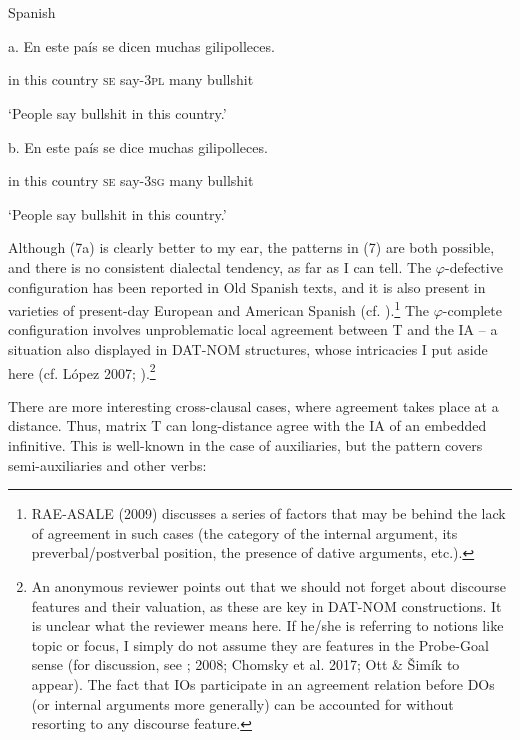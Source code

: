 \documentclass[output=paper]{langsci/langscibook}
\begin{document}
\ea%
    \label{ex:key:7}
    \gll\\
        \\
    \glt
    \z

          Spanish

a.   En  este  país        se   dicen       muchas  gilipolleces.       

        in   this   country  \textsc{se}  say\textsc{{}-3pl}  many     bullshit

             ‘People say bullshit in this country.’

  b.   En  este  país        se   dice        muchas  gilipolleces.      

        in   this   country  \textsc{se} say\textsc{{}-3sg}  many     bullshit

             ‘People say bullshit in this country.’

Although (7a) is clearly better to my ear, the patterns in (7) are both possible, and there is no consistent dialectal tendency, as far as I can tell. The $\varphi $-defective configuration has been reported in Old Spanish texts, and it is also present in varieties of present-day European and American Spanish (cf. \citealt{Mendikoetxea1999}).\footnote{RAE-ASALE (2009) discusses a series of factors that may be behind the lack of agreement in such cases (the category of the internal argument, its preverbal/postverbal position, the presence of dative arguments, etc.).} The $\varphi $-complete configuration involves unproblematic local agreement between T and the IA – a situation also displayed in DAT-NOM structures, whose intricacies I put aside here (cf. López 2007; \citealt{Chomsky2008}).\footnote{An anonymous reviewer points out that we should not forget about discourse features and their valuation, as these are key in DAT-NOM constructions. It is unclear what the reviewer means here. If he/she is referring to notions like topic or focus, I simply do not assume they are features in the Probe-Goal sense (for discussion, see \citealt{Chomsky2001}; 2008; Chomsky et al. 2017; Ott \& Šimík to appear). The fact that IOs participate in an agreement relation before DOs (or internal arguments more generally)  can be accounted for without resorting to any discourse feature.} 

  There are more interesting cross-clausal cases, where agreement takes place at a distance. Thus, matrix T can long-distance agree with the IA of an embedded infinitive. This is well-known in the case of auxiliaries, but the pattern covers semi-auxiliaries and other verbs: 
\end{document}
